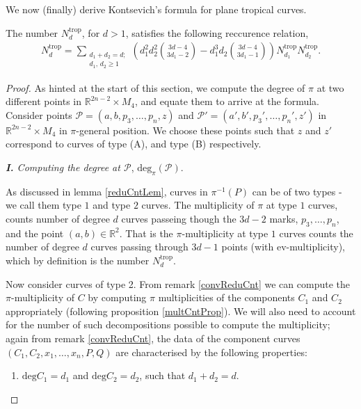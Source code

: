 We now (finally) derive Kontsevich's formula for plane tropical curves.
\begin{theorem}
    The number $N_{d}^{\text{trop}}$, for $d>1$, satisfies the following reccurence relation,
    \begin{align*}
        N^{\text{trop}}_{d} = \sum_{\substack{d_{1}+d_{2}=d;\\ d_{1},\,d_{2}\geq1}}
        \left( d_{1}^{2}d_{2}^{2} \binom{3d-4}{3d_{1}-2} - d_{1}^{3}d_{2}\binom{3d-4}{3d_{1}-1} \right) N^{\text{trop}}_{d_{1}}N^{\text{trop}}_{d_{2}}.
    \end{align*}
\end{theorem}
\begin{proof}
    As hinted at the start of this section, we compute the degree of $\pi$ at two different points in $\mathbb{R}^{2n-2}\times M_{4}$, and equate them to arrive at the formula.
    Consider points $\mathcal{P} = (a,b,p_{3}, \dots, p_{n},z)$ and $\mathcal{P}' = (a',b',p_{3}', \dots, p_{n}',z')$ in $\mathbb{R}^{2n-2}\times M_{4}$ in $\pi$-general position. 
    We choose these points such that $z$ and $z'$ correspond to curves of type (A), and type (B) respectively.
    \par \textit{\textbf{I.} Computing the degree at $\mathcal{P}$}, $\text{deg}_{\pi}(\mathcal{P})$.
    \par As discussed in lemma \ref{reduCntLem}, curves in $\pi^{-1}(P)$ can be of two types - we call them type $1$ and type $2$ curves.
    The multiplicity of $\pi$ at type $1$ curves, counts number of degree $d$ curves passeing though the $3d-2$ marks, $p_{3}, \dots, p_{n}$, and the point $(a,b) \in \mathbb{R}^{2}$.
    That is the $\pi$-multiplicity at type $1$ curves counts the number of degree $d$ curves passing through $3d-1$ points (with $\text{ev}$-multiplicity), which by definition is the number $N^{\text{trop}}_{d}$.
    \par Now consider curves of type 2.
    From remark \ref{convReduCnt} we can compute the $\pi$-multiplicity of $C$ by computing $\pi$ multiplicities of the components $C_{1}$ and $C_{2}$ appropriately (following proposition \ref{multCntProp}).
    We will also need to account for the number of such decompositions possible to compute the multiplicity; again from remark \ref{convReduCnt}, the data of the component curves $(C_{1},C_{2},x_{1},\dots,x_{n},P,Q)$ are characterised by the following properties:
    \begin{enumerate}
        \item $\text{deg}C_{1} = d_{1}$ and $\text{deg}C_{2} = d_{2}$, such that $d_{1}+d_{2}=d$.

\end{enumerate}
\end{proof}
